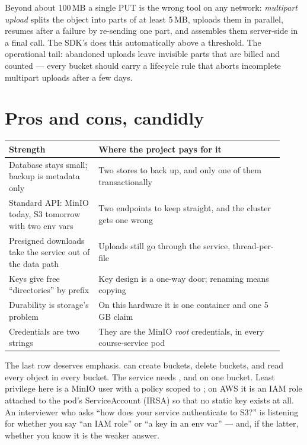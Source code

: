 Beyond about 100\,MB a single PUT is the wrong tool on any network:
\emph{multipart upload} splits the object into parts of at least
5\,MB, uploads them in parallel, resumes after a failure by re-sending
one part, and assembles them server-side in a final call. The SDK's
 does this automatically above a threshold. The
operational tail: abandoned uploads leave invisible parts that are
billed and counted --- every bucket should carry a lifecycle rule that
aborts incomplete multipart uploads after a few days.

\section{Pros and cons, candidly}

\begin{center}
\begin{tabular}{@{}p{0.3\linewidth}p{0.62\linewidth}@{}}
\toprule
\textbf{Strength} & \textbf{Where the project pays for it} \\
\midrule
Database stays small; backup is metadata only &
  Two stores to back up, and only one of them transactionally \\
Standard API: MinIO today, S3 tomorrow with two env vars &
  Two endpoints to keep straight, and the cluster gets one wrong \\
Presigned downloads take the service out of the data path &
  Uploads still go through the service, thread-per-file \\
Keys give free ``directories'' by prefix &
  Key design is a one-way door; renaming means copying \\
Durability is storage's problem &
  On this hardware it is one container and one 5\,GB claim \\
Credentials are two strings &
  They are the MinIO \emph{root} credentials, in every course-service pod \\
\bottomrule
\end{tabular}
\end{center}

The last row deserves emphasis.  can create buckets,
delete buckets, and read every object in every bucket. The service
needs ,  and  on one
bucket. Least privilege here is a MinIO user with a policy scoped to
; on AWS it is an IAM role attached
to the pod's ServiceAccount (IRSA) so that no static key exists at all.
An interviewer who asks ``how does your service authenticate to S3?''
is listening for whether you say ``an IAM role'' or ``a key in an env
var'' --- and, if the latter, whether you know it is the weaker answer.

